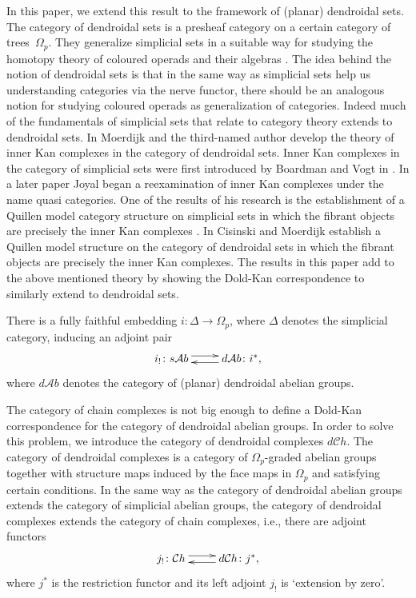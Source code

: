 \documentclass[a4paper]{amsart}
\theoremstyle{plain}
\theoremstyle{definition}
\theoremstyle{remark}
\newcommand{\A}{\mathcal{A}b}
\newcommand{\Ch}{\mathcal{C}h}
\numberwithin{equation}{section}
\numberwithin{figure}{section}
\begin{document}
In this paper, we extend this result to the framework of (planar)
dendroidal sets. The category of dendroidal sets is a presheaf
category on a certain category of trees~$\Omega_p$. They generalize
simplicial sets in a suitable way for studying the homotopy theory
of coloured operads and their algebras \cite{moerdijkweiss}. The
idea behind the notion of dendroidal sets is that in the same way as
simplicial sets help us understanding categories via the nerve
functor, there should be an analogous notion for studying coloured
operads as generalization of categories. Indeed much of the fundamentals of simplicial sets
that relate to category theory extends to dendroidal sets. In \cite{moerdijkweiss2} Moerdijk and the third-named
author develop the theory of inner Kan complexes in the category of dendroidal sets. Inner Kan complexes in
the category of simplicial sets were first introduced by Boardman and Vogt in \cite{BV73}. In a later paper
\cite{joyal} Joyal began a reexamination of inner Kan complexes under the name quasi categories.
One of the results of his research is the establishment of a Quillen model category structure on simplicial
sets in which the fibrant objects are precisely the inner Kan complexes  \cite{lurie}.
In \cite{moerdijkcisinski} Cisinski and Moerdijk establish a Quillen model structure on the category of dendroidal
sets in which the fibrant objects are precisely the inner Kan complexes.
The results in this paper add to the above mentioned theory by showing the Dold-Kan correspondence to similarly
extend to dendroidal sets.

There is a fully faithful
embedding $i\colon\Delta\longrightarrow\Omega_p$, where $\Delta$
denotes the simplicial category, inducing an adjoint pair
$$
\xymatrix{
i_!\colon s\A \ar@<3pt>[r] & \ar@<3pt>[l] d\A\colon i^*,
}
$$
where $d\A$ denotes the category of (planar) dendroidal abelian
groups.

The category of chain complexes is not big enough to define a Dold-Kan correspondence for the category of dendroidal abelian groups. In order to
solve this problem, we introduce the category of dendroidal complexes $d\Ch$. The category of dendroidal complexes is a category of $\Omega_p$-graded abelian groups together with structure maps induced by the face maps in $\Omega_p$ and satisfying certain conditions. In the same way as the category of dendroidal abelian groups extends the category of simplicial abelian groups, the category of dendroidal complexes extends the category of chain complexes, i.e., there are adjoint functors
$$
\xymatrix{
j_!\colon \Ch \ar@<3pt>[r] & \ar@<3pt>[l] d\Ch\colon j^*,
}
$$
where $j^*$ is the restriction functor and its left adjoint $j_!$ is `extension by zero'.
\end{document}
